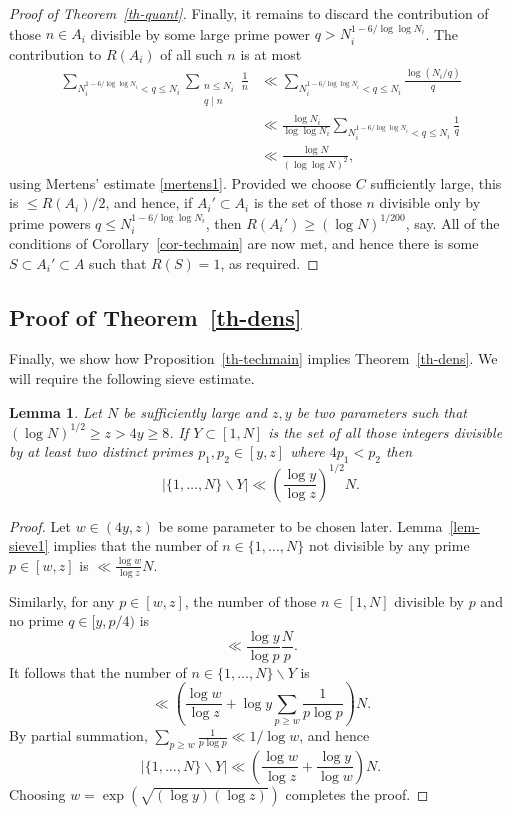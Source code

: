 \documentclass[12pt]{amsart}
\newcommand{\abs}[1]{\left\lvert #1\right\rvert}
\newcommand{\brac}[1]{\left( #1\right)}
\newtheorem{lemma}{Lemma}
\begin{document}
\begin{proof}[Proof of Theorem~\ref{th-quant}]
Finally, it remains to discard the contribution of those $n\in A_i$ divisible by some large prime power $q> N_i^{1-6/\log\log N_i}$. The contribution to $R(A_i)$ of all such $n$ is at most
\begin{align*}
\sum_{N_i^{1-6/\log\log N_i}< q\leq N_i}\sum_{\substack{n\leq N_i\\ q\mid n}}\frac{1}{n}
&\ll \sum_{N_i^{1-6/\log\log N_i}< q\leq N_i}\frac{\log(N_i/q)}{q}\\
&\ll \frac{\log N_i}{\log\log N_i}\sum_{N_i^{1-6/\log\log N_i}<q\leq N_i}\frac{1}{q}\\
&\ll \frac{\log N}{(\log\log N)^2},
\end{align*}
using Mertens' estimate \eqref{mertens1}. Provided we choose $C$ sufficiently large, this is $\leq R(A_i)/2$, and hence, if $A_i'\subset A_i$ is the set of those $n$ divisible only by prime powers $q\leq N_i^{1-6/\log\log N_i}$, then $R(A_i')\geq (\log N)^{1/200}$, say. All of the conditions of Corollary~\ref{cor-techmain} are now met, and hence there is some $S\subset A_i'\subset A$ such that $R(S)=1$, as required.
\end{proof}

\subsection{Proof of Theorem~\ref{th-dens}}

Finally, we show how Proposition~\ref{th-techmain} implies Theorem~\ref{th-dens}. We will require the following sieve estimate.

\begin{lemma}\label{sieve2}
Let $N$ be sufficiently large and $z,y$ be two parameters such that $(\log N)^{1/2}\geq z>4y\geq 8$. If $Y\subset [1,N]$ is the set of all those integers divisible by at least two distinct primes $p_1,p_2\in [y,z]$ where $4p_1<p_2$ then
\[\abs{ \{1,\ldots,N\}\backslash Y}\ll \brac{\frac{\log y}{\log z}}^{1/2}N.\]
\end{lemma}
\begin{proof}
Let $w\in (4y,z)$ be some parameter to be chosen later. Lemma~\ref{lem-sieve1} implies that the number of $n\in \{1,\ldots,N\}$ not divisible by any prime $p\in [w,z]$ is $\ll \frac{\log w}{\log z}N$.

Similarly, for any $p\in [w,z]$, the number of those $n\in [1,N]$ divisible by $p$ and no prime  $q\in [y,p/4)$ is
\[\ll \frac{\log y}{\log p}\frac{N}{p}.\]
It follows that the number of $n\in\{1,\ldots,N\}\backslash Y$ is 
\[\ll \brac{\frac{\log w}{\log z}+ \log y\sum_{p\geq w}\frac{1}{p\log p}}N.\]
By partial summation, $\sum_{p\geq w}\frac{1}{p\log p}\ll 1/\log w$, and hence 
\[\abs{ \{1,\ldots,N\}\backslash Y}\ll \brac{\frac{\log w}{\log z}+\frac{ \log y}{\log w}}N.\]
Choosing $w=\exp\brac{\sqrt{(\log y)(\log z)}}$ completes the proof. 
\end{proof}
\end{document}
